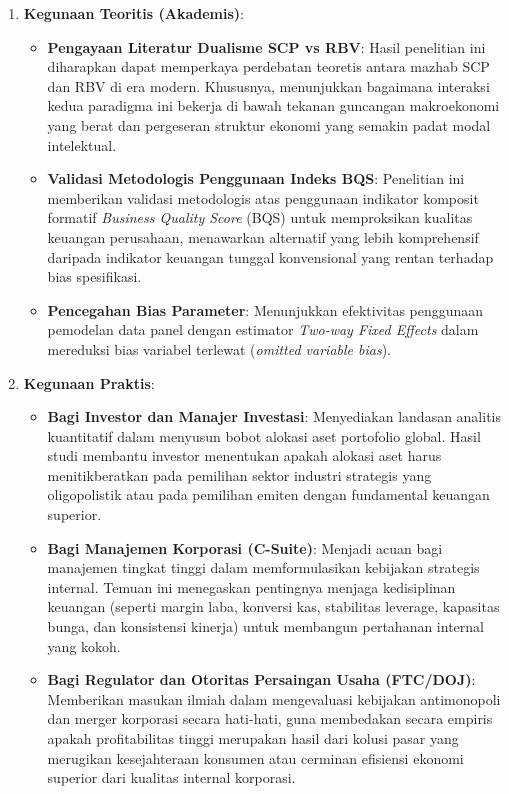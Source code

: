 \documentclass[12pt,a4paper]{article}
\providecommand{\tightlist}{%
  \setlength{\itemsep}{0pt}\setlength{\parskip}{0pt}%
}
\begin{document}
\begin{enumerate}
\def\labelenumi{\arabic{enumi}.}
\tightlist
\item
  \textbf{Kegunaan Teoritis (Akademis)}:

  \begin{itemize}
  \tightlist
  \item
    \textbf{Pengayaan Literatur Dualisme SCP vs RBV}: Hasil penelitian
    ini diharapkan dapat memperkaya perdebatan teoretis antara mazhab
    SCP dan RBV di era modern. Khususnya, menunjukkan bagaimana
    interaksi kedua paradigma ini bekerja di bawah tekanan guncangan
    makroekonomi yang berat dan pergeseran struktur ekonomi yang semakin
    padat modal intelektual.
  \item
    \textbf{Validasi Metodologis Penggunaan Indeks BQS}: Penelitian ini
    memberikan validasi metodologis atas penggunaan indikator komposit
    formatif \emph{Business Quality Score} (BQS) untuk memproksikan
    kualitas keuangan perusahaan, menawarkan alternatif yang lebih
    komprehensif daripada indikator keuangan tunggal konvensional yang
    rentan terhadap bias spesifikasi.
  \item
    \textbf{Pencegahan Bias Parameter}: Menunjukkan efektivitas
    penggunaan pemodelan data panel dengan estimator \emph{Two-way Fixed
    Effects} dalam mereduksi bias variabel terlewat (\emph{omitted
    variable bias}).
  \end{itemize}
\item
  \textbf{Kegunaan Praktis}:

  \begin{itemize}
  \tightlist
  \item
    \textbf{Bagi Investor dan Manajer Investasi}: Menyediakan landasan
    analitis kuantitatif dalam menyusun bobot alokasi aset portofolio
    global. Hasil studi membantu investor menentukan apakah alokasi aset
    harus menitikberatkan pada pemilihan sektor industri strategis yang
    oligopolistik atau pada pemilihan emiten dengan fundamental keuangan
    superior.
  \item
    \textbf{Bagi Manajemen Korporasi (C-Suite)}: Menjadi acuan bagi
    manajemen tingkat tinggi dalam memformulasikan kebijakan strategis
    internal. Temuan ini menegaskan pentingnya menjaga kedisiplinan
    keuangan (seperti margin laba, konversi kas, stabilitas leverage,
    kapasitas bunga, dan konsistensi kinerja) untuk membangun pertahanan
    internal yang kokoh.
  \item
    \textbf{Bagi Regulator dan Otoritas Persaingan Usaha (FTC/DOJ)}:
    Memberikan masukan ilmiah dalam mengevaluasi kebijakan antimonopoli
    dan merger korporasi secara hati-hati, guna membedakan secara
    empiris apakah profitabilitas tinggi merupakan hasil dari kolusi
    pasar yang merugikan kesejahteraan konsumen atau cerminan efisiensi
    ekonomi superior dari kualitas internal korporasi.
  \end{itemize}
\end{enumerate}
\end{document}
